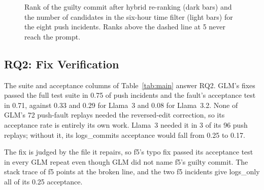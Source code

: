 \documentclass[12pt,onecolumn,draftclsnofoot]{IEEEtran}
\begin{document}
\begin{figure}[!t]
\centering
{}
\caption{Rank of the guilty commit after hybrid re-ranking (dark bars) and the number of candidates in the six-hour time filter (light bars) for the eight push incidents. Ranks above the dashed line at 5 never reach the prompt.}
\label{fig:rank}
\end{figure}

\subsection{RQ2: Fix Verification}
The suite and acceptance columns of Table~\ref{tab:main} answer RQ2. GLM's fixes passed the full test suite in 0.75 of push incidents and the fault's acceptance test in 0.71, against 0.33 and 0.29 for Llama~3 and 0.08 for Llama~3.2. None of GLM's 72 push-fault replays needed the reversed-edit correction, so its acceptance rate is entirely its own work. Llama~3 needed it in 3 of its 96 push replays; without it, its logs\_commits acceptance would fall from 0.25 to 0.17.

The fix is judged by the file it repairs, so f5's typo fix passed its acceptance test in every GLM repeat even though GLM did not name f5's guilty commit. The stack trace of f5 points at the broken line, and the two f5 incidents give logs\_only all of its 0.25 acceptance.
\end{document}

